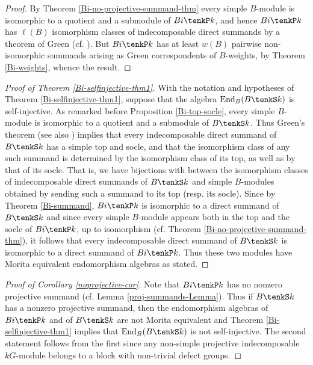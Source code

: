 \documentclass{amsart}
\theoremstyle{plain}\newtheorem{Theorem}{Theorem}[section]
\theoremstyle{plain}\newtheorem{Conjecture}[Theorem]{Conjecture}
\theoremstyle{plain}\newtheorem{Corollary}[Theorem]{Corollary}
\theoremstyle{plain}\newtheorem{Lemma}[Theorem]{Lemma}
\theoremstyle{plain}\newtheorem{Proposition}[Theorem]{Proposition}
\theoremstyle{definition}\newtheorem{Definition}[Theorem]{Definition}
\theoremstyle{definition}\newtheorem{Example}[Theorem]{Example}
\theoremstyle{definition}\newtheorem{Examples}[Theorem]{Examples}
\theoremstyle{definition}\newtheorem{Exercise}[Theorem]{Exercise}
\theoremstyle{definition}\newtheorem{Notation}[Theorem]{Notation}
\theoremstyle{definition}\newtheorem{Remark}[Theorem]{Remark}
\theoremstyle{definition}\newtheorem{Remarks}[Theorem]{Remarks}
\theoremstyle{plain}\newtheorem{Statement}[Theorem]{}
\def\End{\mathrm{End}}
\begin{document}
\begin{proof}
By  Theorem \ref{Bi-no-projective-summand-thm} every simple
$B$-module is isomorphic to a quotient and a submodule of $Bi\tenkP k$,
and hence $Bi\tenkP k$ has $\ell(B)$ isomorphism classes of indecomposable
direct summands by a theorem of Green (cf. \cite[Theorem 2.13]{Geck01}).
But $Bi\tenkP k$ has  at least $w(B)$ pairwise non-isomorphic summands
arising as Green correspondents of $B$-weights, by Theorem \ref{Bi-weights}, 
whence the result.
\end{proof}
 



\begin{proof}[{Proof of Theorem \ref{Bi-selfinjective-thm1}}]
With the notation and hypotheses of Theorem \ref{Bi-selfinjective-thm1}, 
suppose that the algebra $\End_B(B\tenkS k)$ is self-injective. 
As remarked before Proposition \ref{Bi-top-socle}, every simple $B$-module
is isomorphic to a quotient and a submodule of $B\tenkS k$. Thus
Green's theorem  \cite[Theorem 1]{Green78} (see also \cite[Theorem 2.13]{Geck01}) 
implies that every indecomposable
direct summand of $B\tenkS k$ has a simple top and socle, and that
the isomorphism class of any such summand is determined by the isomorphism
class of its top, as well as by that of its socle. That is, we have
bijections with between the isomorphism classes of indecomposable direct
summands of $B\tenkS k$ and simple $B$-modules obtained by sending such
a summand to its top (resp. its socle).
Since   by Theorem \ref{Bi-summand},  $Bi\tenkP k$ is isomorphic to a direct  
summand of $B\tenkS k$ 
 and since every simple $B$-module appears both 
in the top and the socle of $Bi\tenkP k$, up to isomorphism 
(cf. Theorem \ref{Bi-no-projective-summand-thm}),  it follows that
every indecomposable direct summand of $B\tenkS k$ is isomorphic to
a direct summand of $Bi\tenkP k$. Thus these two modules have Morita
equivalent endomorphism algebras as stated. 
\end{proof}

\begin{proof}[{Proof of Corollary \ref{noprojective-cor}}]
Note that $Bi\tenkP k$ has no nonzero projective summand (cf. 
Lemma \ref{proj-summands-Lemma}).
Thus if $B\tenkS k$ has a nonzero projective summand, then 
the endomorphism algebras of $Bi\tenkP k$ and of $B\tenkS k$ are
not Morita equivalent and Theorem \ref{Bi-selfinjective-thm1} implies that 
$\End_B(B\tenkS k)$ 
is not self-injective. The second  statement follows from the first since  
any  non-simple projective indecomposable  $kG$-module    
belongs to a block with  non-trivial defect groups.
\end{proof}
\end{document}
